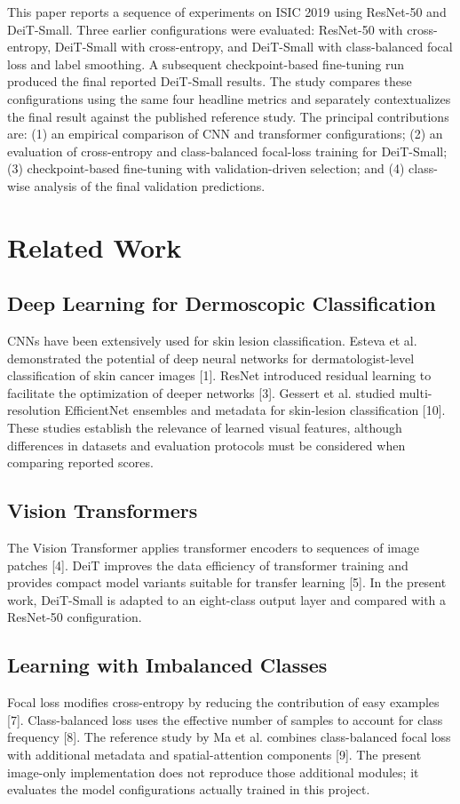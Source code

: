 \documentclass[conference]{IEEEtran}
\begin{document}
This paper reports a sequence of experiments on ISIC 2019 using ResNet-50 and DeiT-Small. Three earlier configurations were evaluated: ResNet-50 with cross-entropy, DeiT-Small with cross-entropy, and DeiT-Small with class-balanced focal loss and label smoothing. A subsequent checkpoint-based fine-tuning run produced the final reported DeiT-Small results. The study compares these configurations using the same four headline metrics and separately contextualizes the final result against the published reference study. The principal contributions are: (1) an empirical comparison of CNN and transformer configurations; (2) an evaluation of cross-entropy and class-balanced focal-loss training for DeiT-Small; (3) checkpoint-based fine-tuning with validation-driven selection; and (4) class-wise analysis of the final validation predictions.

\section{Related Work}
\subsection{Deep Learning for Dermoscopic Classification}
CNNs have been extensively used for skin lesion classification. Esteva et al. demonstrated the potential of deep neural networks for dermatologist-level classification of skin cancer images [1]. ResNet introduced residual learning to facilitate the optimization of deeper networks [3]. Gessert et al. studied multi-resolution EfficientNet ensembles and metadata for skin-lesion classification [10]. These studies establish the relevance of learned visual features, although differences in datasets and evaluation protocols must be considered when comparing reported scores.

\subsection{Vision Transformers}
The Vision Transformer applies transformer encoders to sequences of image patches [4]. DeiT improves the data efficiency of transformer training and provides compact model variants suitable for transfer learning [5]. In the present work, DeiT-Small is adapted to an eight-class output layer and compared with a ResNet-50 configuration.

\subsection{Learning with Imbalanced Classes}
Focal loss modifies cross-entropy by reducing the contribution of easy examples [7]. Class-balanced loss uses the effective number of samples to account for class frequency [8]. The reference study by Ma et al. combines class-balanced focal loss with additional metadata and spatial-attention components [9]. The present image-only implementation does not reproduce those additional modules; it evaluates the model configurations actually trained in this project.
\end{document}
